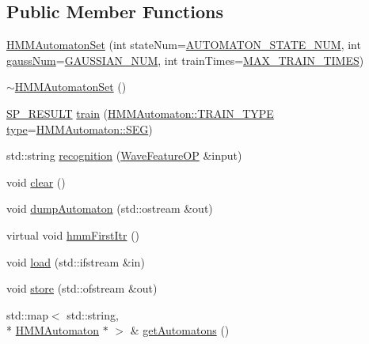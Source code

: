 \subsection*{Public Member Functions}
\begin{DoxyCompactItemize}
\item 
\hyperlink{class_h_m_m_automaton_set_afa2bb2913d8c0db8342ddd8bd7e1bb04}{H\+M\+M\+Automaton\+Set} (int state\+Num=\hyperlink{configure__hmm_8h_aa9cc71cb42394379957677c761aae79e}{A\+U\+T\+O\+M\+A\+T\+O\+N\+\_\+\+S\+T\+A\+T\+E\+\_\+\+N\+U\+M}, int \hyperlink{pro6__demo_8cpp_a923ffcfa3c56ccdba17bc4e700247d54}{gauss\+Num}=\hyperlink{configure__hmm_8h_a8f9db0624fff0b17f641785bb8d66a82}{G\+A\+U\+S\+S\+I\+A\+N\+\_\+\+N\+U\+M}, int train\+Times=\hyperlink{configure__hmm_8h_a52e22519b5a37e58632e9183d5197b86}{M\+A\+X\+\_\+\+T\+R\+A\+I\+N\+\_\+\+T\+I\+M\+E\+S})
\item 
\hyperlink{class_h_m_m_automaton_set_a41a4e5d534568262a640a9237c73926d}{$\sim$\+H\+M\+M\+Automaton\+Set} ()
\item 
\hyperlink{tool_8h_ab71a1f2fb85a32402ced5c483105b38e}{S\+P\+\_\+\+R\+E\+S\+U\+L\+T} \hyperlink{class_h_m_m_automaton_set_a686a1c4d3346935b3d8eec625b82510e}{train} (\hyperlink{class_h_m_m_automaton_aa3476c86db5e0791de6f07076f220348}{H\+M\+M\+Automaton\+::\+T\+R\+A\+I\+N\+\_\+\+T\+Y\+P\+E} \hyperlink{readhtk_8m_ac7798f4aec24aa6076b2b222bd91d4fd}{type}=\hyperlink{class_h_m_m_automaton_aa3476c86db5e0791de6f07076f220348a725fd42edf8b8e4b515b6296a7d67bb3}{H\+M\+M\+Automaton\+::\+S\+E\+G})
\item 
std\+::string \hyperlink{class_h_m_m_automaton_set_a382c05997febb1e859618f5bf9467b47}{recognition} (\hyperlink{class_wave_feature_o_p}{Wave\+Feature\+O\+P} \&input)
\item 
void \hyperlink{class_h_m_m_automaton_set_ad505e5de6b64837fa67e4873fcfc1e64}{clear} ()
\item 
void \hyperlink{class_h_m_m_automaton_set_a377877b860bba5582aa9a6d620e4263a}{dump\+Automaton} (std\+::ostream \&out)
\item 
virtual void \hyperlink{class_h_m_m_automaton_set_a2d3881f6b36d59a8f9ef7b5fd08a22c0}{hmm\+First\+Itr} ()
\item 
void \hyperlink{class_h_m_m_automaton_set_a9b4e5a865ebbf115c5a59790ec906730}{load} (std\+::ifstream \&in)
\item 
void \hyperlink{class_h_m_m_automaton_set_a42f527337ed25942fed703b4afde8ea4}{store} (std\+::ofstream \&out)
\item 
std\+::map$<$ std\+::string, \\*
\hyperlink{class_h_m_m_automaton}{H\+M\+M\+Automaton} $\ast$ $>$ \& \hyperlink{class_h_m_m_automaton_set_a4b9e182c8d99965bf8356153a9751c1e}{get\+Automatons} ()
\end{DoxyCompactItemize}
